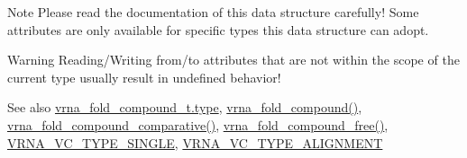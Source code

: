 \begin{DoxyNote}{Note}
Please read the documentation of this data structure carefully! Some attributes are only available for specific types this data structure can adopt.
\end{DoxyNote}
\begin{DoxyWarning}{Warning}
Reading/\+Writing from/to attributes that are not within the scope of the current type usually result in undefined behavior!
\end{DoxyWarning}
\begin{DoxySeeAlso}{See also}
\hyperlink{group__fold__compound_ac5eab693deac9a1a40c2a95ac294707c}{vrna\+\_\+fold\+\_\+compound\+\_\+t.\+type}, \hyperlink{group__fold__compound_ga6601d994ba32b11511b36f68b08403be}{vrna\+\_\+fold\+\_\+compound()}, \hyperlink{group__fold__compound_gad6bacc816af274922b13d947f708aa0c}{vrna\+\_\+fold\+\_\+compound\+\_\+comparative()}, \hyperlink{group__fold__compound_gadded6039d63f5d6509836e20321534ad}{vrna\+\_\+fold\+\_\+compound\+\_\+free()}, \hyperlink{group__fold__compound_gga01a4ff86fa71deaaa5d1abbd95a1447da1608d3aa78905fc39e0d25a624ac9512}{V\+R\+N\+A\+\_\+\+V\+C\+\_\+\+T\+Y\+P\+E\+\_\+\+S\+I\+N\+G\+LE}, \hyperlink{group__fold__compound_gga01a4ff86fa71deaaa5d1abbd95a1447da056345f1bcfe7cd595d1fd437c05246d}{V\+R\+N\+A\+\_\+\+V\+C\+\_\+\+T\+Y\+P\+E\+\_\+\+A\+L\+I\+G\+N\+M\+E\+NT}
\end{DoxySeeAlso}

